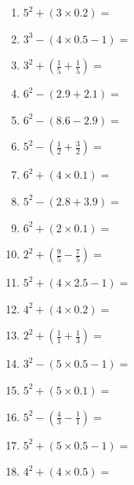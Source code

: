 \documentclass[12pt]{article}
\begin{document}
    \begin{enumerate}
\item \large $ 5^{2} + (3 \times 0.2) = $ \vspace{1.4cm}
\item \large $ 3^{3} - (4 \times 0.5 - 1) = $ \vspace{1.4cm}
\item \large $ 3^{2} + (\frac{1}{5} + \frac{1}{5}) = $ \vspace{1.4cm}
\item \large $ 6^{2} - (2.9 + 2.1) = $ \vspace{1.4cm}
\item \large $ 6^{2} - (8.6 - 2.9) = $ \vspace{1.4cm}
\item \large $ 5^{2} - (\frac{1}{2} + \frac{3}{2}) = $ \vspace{1.4cm}
\item \large $ 6^{2} + (4 \times 0.1) = $ \vspace{1.4cm}
\item \large $ 5^{2} - (2.8 + 3.9) = $ \vspace{1.4cm}
\newpage
\item \large $ 6^{2} + (2 \times 0.1) = $ \vspace{1.4cm}
\item \large $ 2^{2} + (\frac{9}{5} - \frac{7}{5}) = $ \vspace{1.4cm}
\item \large $ 5^{2} + (4 \times 2.5 - 1) = $ \vspace{1.4cm}
\item \large $ 4^{2} + (4 \times 0.2) = $ \vspace{1.4cm}
\item \large $ 2^{2} + (\frac{1}{1} + \frac{1}{3}) = $ \vspace{1.4cm}
\item \large $ 3^{2} - (5 \times 0.5 - 1) = $ \vspace{1.4cm}
\item \large $ 5^{2} + (5 \times 0.1) = $ \vspace{1.4cm}
\item \large $ 5^{2} - (\frac{4}{3} - \frac{1}{1}) = $ \vspace{1.4cm}
\item \large $ 5^{2} + (5 \times 0.5 - 1) = $ \vspace{1.4cm}
\item \large $ 4^{2} + (4 \times 0.5) = $ \vspace{1.4cm}

\end{enumerate}
\end{document}
